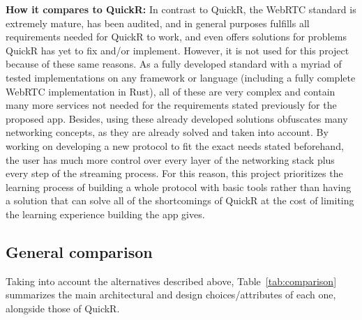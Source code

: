 \documentclass{article}
\begin{document}
    \textbf{How it compares to QuickR:} In contrast to QuickR, the WebRTC standard is extremely mature, has been audited, and in general purposes fulfills all requirements needed for QuickR to work, and even offers solutions for problems QuickR has yet to fix and/or implement. However, it is not used for this project because of these same reasons.
    As a fully developed standard with a myriad of tested implementations on any framework or language (including a fully complete WebRTC implementation in Rust), all of these are very complex and contain many more services not needed for the requirements stated previously for the proposed app. Besides, using these already developed solutions obfuscates
    many networking concepts, as they are already solved and taken into account. By working on developing a new protocol to fit the exact needs stated beforehand, the user has much more control over every layer of the networking stack plus every step of the streaming process. For this reason, this project prioritizes the learning process of building
    a whole protocol with basic tools rather than having a solution that can solve all of the shortcomings of QuickR at the cost of limiting the learning experience building the app gives. 

    \subsection{General comparison}
    Taking into account the alternatives described above, Table~\ref{tab:comparison} summarizes the main architectural and design choices/attributes of each one, alongside those of QuickR.
\end{document}
